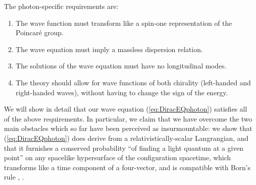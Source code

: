 \documentclass[12pt]{article}
\theoremstyle{definition}
\newcommand{\refeq}[1]{(\ref{#1})}
\numberwithin{equation}{section}
\begin{document}
 The photon-specific requirements are:
\begin{enumerate}
\item The wave function must transform like a spin-one representation of the Poincar\'e group.
\item The wave equation must imply a massless dispersion relation.
\item The solutions of the wave equation must have no longitudinal modes.
\item The theory should allow for wave functions of both chirality (left-handed and right-handed waves), without having to change 
the sign of the energy.
\end{enumerate}

 We will show in detail that our wave equation \refeq{eq:DiracEQphoton} satisfies all of the above requirements.
 In particular, we claim that we have overcome the two main obstacles which so far have been perceived as insurmountable:
we show that \refeq{eq:DiracEQphoton} does derive from a relativistically-scalar Langrangian, 
and that it furnishes a conserved probability  ``of finding a light quantum at a given point'' on any spacelike hypersurface 
of the configuration spacetime,  which transforms like a time component of a four-vector, and is
compatible with Born's rule \cite{BornsPSISQUAREpapersA, BornsPSISQUAREpapersB}, \cite{Dirac1930}.
\end{document}

